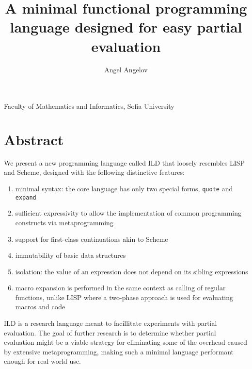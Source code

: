 \documentclass[11pt]{amsart}
\title[Title]{\bf A minimal functional programming language designed for easy partial evaluation}
\author[Angel]{Angel Angelov}
\newcommand\lang{ILD }
\theoremstyle{definition}
\begin{document}
\maketitle

\begin{center}
Faculty of Mathematics and Informatics, Sofia University
\end{center}

\section*{Abstract}

We present a new programming language called \lang that loosely resembles LISP
and Scheme, designed with the following distinctive features:

\begin{enumerate}
    \item minimal syntax: the core language has only two special
    forms, \texttt{quote} and \texttt{expand}
    \item sufficient expressivity to allow the implementation of common programming constructs
    via metaprogramming
    \item support for first-class continuations akin to Scheme
    \item\label{immutable} immutability of basic data structures
    \item\label{isolatedsiblings} isolation: the value of an expression does not
    depend on its sibling expressions
    \item\label{runtimemacros} macro expansion is performed in the same context as
    calling of regular functions, unlike LISP where a two-phase approach is used for evaluating macros and code
\end{enumerate}

\lang is a research language meant to facillitate experiments with partial evaluation.
The goal of further research is to determine whether partial evaluation might be
a viable strategy for eliminating some of the overhead caused by extensive metaprogramming,
making such a minimal language performant enough for real-world use.

%
%
%
%

\bigskip
\end{document}
